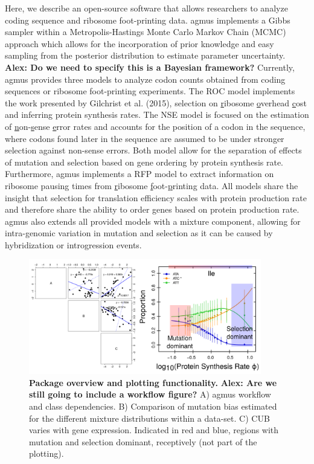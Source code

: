 \documentclass{bioinfo}
\newcommand{\package}{agmus } %
\begin{document}
Here, we describe an open-source software that allows researchers to analyze coding sequence and ribosome foot-printing data. 
\package implements a Gibbs sampler within a Metropolis-Hastings Monte Carlo Markov Chain (MCMC) approach which allows for the incorporation of prior knowledge and easy sampling from the posterior distribution to estimate parameter uncertainty. \textbf{Alex: Do we need to specify this is a Bayesian framework?}
Currently, \package provides three models to analyze codon counts obtained from coding sequences or ribosome foot-printing experiments. 
The ROC model implements the work presented by Gilchrist et al. (2015), selection on \underline{r}ibosome \underline{o}verhead \underline{c}ost and inferring protein synthesis rates.
The NSE model is focused on the estimation of \underline{n}on-\underline{s}ense \underline{e}rror rates and accounts for the position of a codon in the sequence, where codons found later in the sequence are assumed to be under stronger selection against non-sense errors.
Both model allow for the separation of effects of mutation and selection based on gene ordering by protein synthesis rate.
Furthermore, \package implements a RFP model to extract information on ribosome pausing times from \underline{r}ibosome \underline{f}oot-\underline{p}rinting data. 
All models share the insight that selection for translation efficiency scales with protein production rate and therefore share the ability to order genes based on protein production rate. 
\package also extends all provided models with a mixture component, allowing for intra-genomic variation in mutation and selection as it can be caused by hybridization or introgression events.

\begin{figure}[!tpb]
\centering
 \includegraphics[width=4in]{comb_plots.png}
\vspace{-0.2cm}
\caption{\textbf{Package overview and plotting functionality.} \textbf{Alex: Are we still going to include a workflow figure?} A) \package workflow and class dependencies. B) Comparison of mutation bias estimated for the different mixture distributions within a data-set. C) CUB varies with gene expression. Indicated in red and blue, regions with mutation and selection dominant, receptively (not part of the plotting). 
}
\label{fig:plotbin}
\end{figure}
\end{document}
